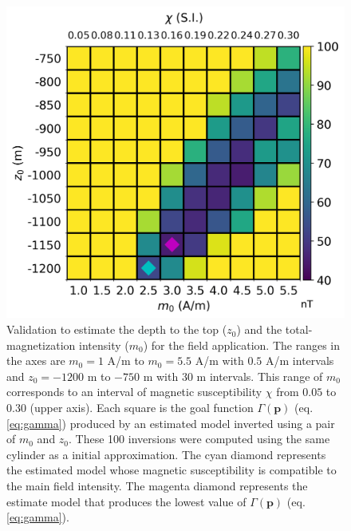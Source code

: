 \begin{figure}
	\centering
	\includegraphics[scale=.75]{figures/real_gamma.png}
	\caption{Validation to estimate the depth to the top ($ z_0 $) and the total-magnetization intensity ($ m_0 $) for the field application. The ranges in the axes are $m_0 = 1$ A/m to $m_0=5.5$ A/m with $0.5$ A/m intervals and $z_0=-1200$ m to $-750$ m with $30$ m intervals. This range of $m_0$ corresponds to an interval of magnetic susceptibility $\chi$ from $0.05$ to $0.30$ (upper axis). Each square is the goal function $ \Gamma(\mathbf{p}) $ (eq. \ref{eq:gamma}) produced by an estimated model inverted using a pair of $m_0$ and $z_0$. These 100 inversions were computed using the same cylinder as a initial approximation. The cyan diamond represents the estimated model whose magnetic susceptibility is compatible to the main field intensity. The magenta diamond represents the estimate model that produces the lowest value of $ \Gamma(\mathbf{p}) $ (eq. \ref{eq:gamma}).
	}
	\label{fig:real_map}
\end{figure}

